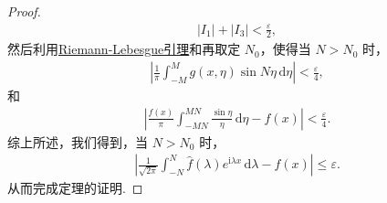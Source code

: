 \documentclass[../../main.tex]{subfiles}%
\begin{document}
\begin{proof}
\begin{align*}
|I_1|+|I_3|<\frac{\varepsilon}{2},
\end{align*}
然后利用\hyperref[Basis of Analytics-lemma:Riemann-Lebesgue引理]{Riemann-Lebesgue引理}和再取定 $N_0$，使得当 $N>N_0$ 时，
\begin{align*}
\left|\frac{1}{\pi}\int_{-M}^{M}g(x,\eta)\sin N\eta\,\mathrm{d}\eta\right|<\frac{\varepsilon}{4},
\end{align*}
和
\begin{align*}
\left|\frac{f(x)}{\pi}\int_{-MN}^{MN}\frac{\sin\eta}{\eta}\,\mathrm{d}\eta-f(x)\right|<\frac{\varepsilon}{4}.
\end{align*}
综上所述，我们得到，当 $N>N_0$ 时，
\begin{align*}
\left|\frac{1}{\sqrt{2\pi}}\int_{-N}^{N}\hat{f}(\lambda)e^{\mathrm{i}\lambda  x}\,\mathrm{d}\lambda-f(x)\right|\leqslant \varepsilon.
\end{align*}
从而完成定理的证明.
\end{proof}
\end{document}
